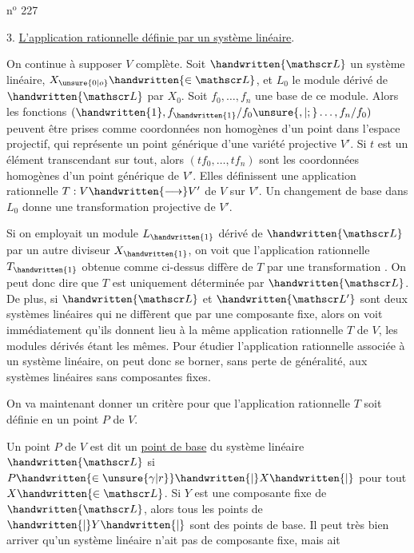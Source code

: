 n$^{\mathrm{o}}$ 227

3. \uline{L'application rationnelle définie par un système linéaire}.

On continue à supposer $V$ complète. Soit $\handwritten{\mathscr L}$ un système linéaire,
$X_{\unsure{0|o}}\handwritten{\in\mathscr L}$, et $L_0$ le module dérivé de $\handwritten{\mathscr L}$ par $X_0$. Soit $f_0,\ldots,f_n$ une
base de ce module. Alors les fonctions $(\handwritten{1},f_{\handwritten{1}}/f_0\unsure{,|;}\ldots,f_n/f_0)$ peuvent
être prises comme coordonnées non homogènes d'un point dans l'espace
projectif, qui représente un point générique d'une variété projective
$V'$. Si $t$ est un élément transcendant sur tout, alors $(tf_0,\ldots,tf_n)$
sont les coordonnées homogènes d'un point générique de $V'$. Elles
définissent une application rationnelle $T:V\handwritten{\longrightarrow}V'$ de $V$ sur $V'$.
Un changement de base dans $L_0$ donne une transformation projective de $V'$.

Si on employait un module $L_{\handwritten{1}}$ dérivé de $\handwritten{\mathscr L}$ par un autre diviseur
$X_{\handwritten{1}}$, on voit que l'application rationnelle $T_{\handwritten{1}}$ obtenue comme ci-dessus
diffère de $T$ par une transformation . On peut donc dire que $T$
est uniquement déterminée par $\handwritten{\mathscr L}$. De plus, si $\handwritten{\mathscr L}$ et $\handwritten{\mathscr L'}$ sont deux
\margin{\handwritten{\(\big|\)}}systèmes linéaires qui ne diffèrent que par une composante fixe, alors
on voit immédiatement qu'ils donnent lieu à la même application rationnelle
$T$ de $V$, les modules dérivés étant les mêmes. Pour étudier l'application
rationnelle associée à un système linéaire, on peut donc se
borner, sans perte de généralité, aux systèmes linéaires sans composantes
fixes.

On va maintenant donner un critère pour que l'application rationnelle
$T$ soit définie en un point $P$ de $V$.

Un point $P$ de $V$ est dit un \uline{point de base} du système linéaire $\handwritten{\mathscr L}$
si $P\handwritten{\in\unsure{\gamma|r}}\handwritten{|}X\handwritten{|}$ pour tout $X\handwritten{\in\mathscr L}$. Si $Y$ est une composante fixe de $\handwritten{\mathscr L}$, alors
tous les points de $\handwritten{|}Y\handwritten{|}$ sont des points de base. Il peut très bien
arriver qu'un système linéaire n'ait pas de composante fixe, mais ait

